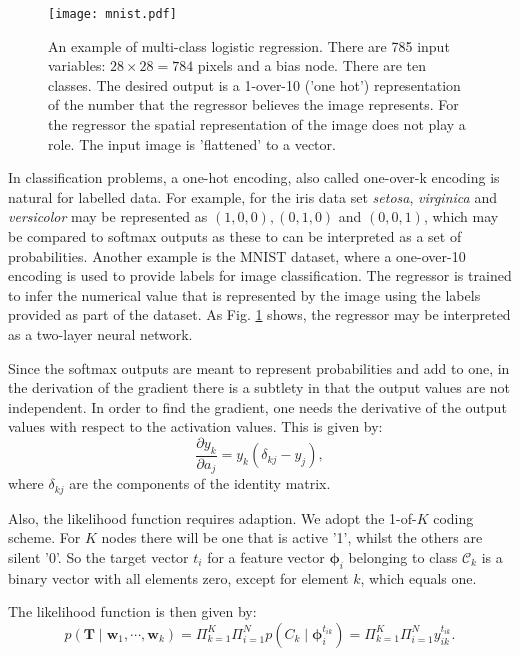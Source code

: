 \begin{figure}[!ht]
  \begin{center}
    \texttt{[image: mnist.pdf]}
  \end{center}
  \caption{An example of multi-class logistic regression. There are 785 input variables: $28 \times 28 = 784$ pixels and a bias node. There are
    ten classes. The desired output is a 1-over-10 ('one hot') representation of the number that the regressor believes the image represents.
    For the regressor the spatial representation of the image does not play a role. The input image is 'flattened' to a vector.}
  \label{fig-logmnist}
\end{figure}

  


In classification problems, a one-hot encoding, also called one-over-k encoding is natural for labelled data. For example, for the iris data set
\emph{setosa}, \emph{virginica} and \emph{versicolor} may be represented as $(1, 0, 0), (0, 1, 0)$ and $(0, 0, 1)$, which may be compared to softmax outputs as these
to can be interpreted as a set of probabilities. Another example is the MNIST dataset, where a one-over-10 encoding is used to provide labels for image classification.
The regressor is trained to infer the numerical value that is represented by the image using the labels provided as part of the dataset.
As Fig. \ref{fig-logmnist} shows, the regressor may be interpreted as a two-layer neural network.



Since the softmax outputs are meant to represent probabilities and add to one, in the derivation of the gradient there is a subtlety
in that the output values are not independent. In order
to find the gradient, one needs the derivative of the output values with respect to the activation values. This is given by:
\begin{equation}
  \frac{\partial y_k}{\partial a_j} = y_k(\delta_{kj} - y_j),
\end{equation}
where $\delta_{kj}$ are the components of the identity matrix.

Also, the likelihood function requires adaption. We adopt the 1-of-$K$ coding scheme. For $K$ nodes there
will be one that is active '1', whilst the others are silent '0'. So the target vector $t_i$ for a feature vector $\boldsymbol{\phi}_i$
belonging to class $\mathcal{C}_k$ is a binary vector with all elements zero, except for element $k$, which equals one.

The likelihood function is then given by:
$$
p(\boldsymbol{T} \mid \boldsymbol{w}_1, \cdots, \boldsymbol{w}_k) = \Pi^K_{k=1}\Pi^N_{i=1} p(C_k \mid \boldsymbol{\phi}_i^{t_{ik}}) = \Pi^K_{k=1}\Pi^N_{i=1} y^{t_{ik}}_{ik}. 
$$
  
